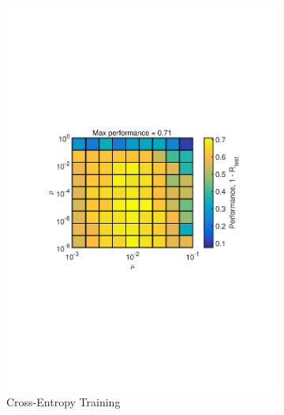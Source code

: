 \documentclass[journal,a4paper,onecolumn,11pt]{IEEEtran}
\begin{document}
\begin{figure}[!h]
\begin{subfigure}{.5\textwidth}
		\includegraphics[width=\textwidth]{para_opt_uppercasechar_ce.pdf}
		\caption{Cross-Entropy Training}
		\label{fig:para_opt_uppercasechar_ce}
	\end{subfigure}
	\begin{subfigure}{.5\textwidth}
		\centering

\end{subfigure}
\end{figure}
\end{document}
